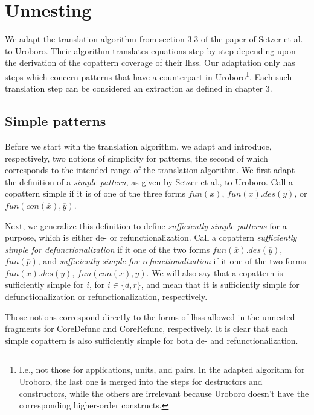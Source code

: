 \section{Unnesting}

We adapt the translation algorithm from section 3.3 of the paper of Setzer et al. to Uroboro. Their algorithm translates equations step-by-step depending upon the derivation of the copattern coverage of their lhss. Our adaptation only has steps which concern patterns that have a counterpart in Uroboro\footnote{I.e., not those for applications, units, and pairs. In the adapted algorithm for Uroboro, the last one is merged into the steps for destructors and constructors, while the others are irrelevant because Uroboro doesn't have the corresponding higher-order constructs.}. Each such translation step can be considered an extraction as defined in chapter 3.

\subsection{Simple patterns}

Before we start with the translation algorithm, we adapt and introduce, respectively, two notions of simplicity for patterns, the second of which corresponds to the intended range of the translation algorithm. We first adapt the definition of a \textit{simple pattern}, as given by Setzer et al., to Uroboro. Call a copattern simple if it is of one of the three forms $fun(\overline{x})$, $fun(\overline{x}).des(\overline{y})$, or $fun(con(\overline{x}), \overline{y})$.

Next, we generalize this definition to define \textit{sufficiently simple patterns} for a purpose, which is either de- or refunctionalization. Call a copattern \textit{sufficiently simple for defunctionalization} if it one of the two forms $fun(\overline{x}).des(\overline{y})$, $fun(\overline{p})$, and \textit{sufficiently simple for refunctionalization} if it one of the two forms $fun(\overline{x}).\overline{des(\overline{y})}$, $fun(con(\overline{x}), \overline{y})$. We will also say that a copattern is sufficiently simple for $i$, for $i \in \{d,r\}$, and mean that it is sufficiently simple for defunctionalization or refunctionalization, respectively.

Those notions correspond directly to the forms of lhss allowed in the unnested fragments for \textsf{CoreDefunc} and \textsf{CoreRefunc}, respectively. It is clear that each simple copattern is also sufficiently simple for both de- and refunctionalization.

